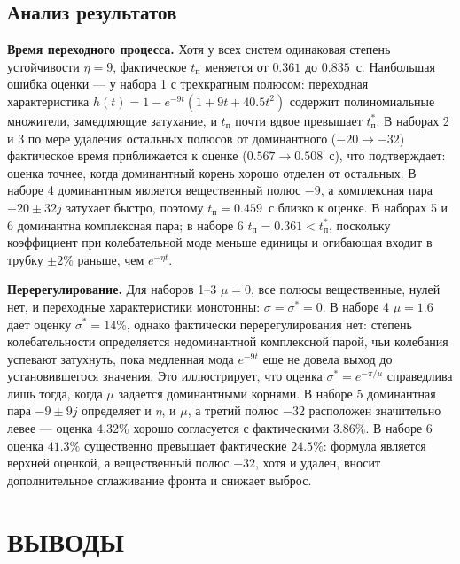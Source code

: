 \documentclass[14pt,a4paper]{extarticle}
\begin{document}
\subsection{Анализ результатов}

\textbf{Время переходного процесса.} Хотя у всех систем одинаковая степень устойчивости $\eta = 9$, фактическое $t_\text{п}$ меняется от $0.361$ до $0.835$~с. Наибольшая ошибка оценки — у набора 1 с трехкратным полюсом: переходная характеристика $h(t) = 1 - e^{-9t}\left(1 + 9t + 40.5t^2\right)$ содержит полиномиальные множители, замедляющие затухание, и $t_\text{п}$ почти вдвое превышает $t_\text{п}^*$. В наборах 2 и 3 по мере удаления остальных полюсов от доминантного ($-20 \to -32$) фактическое время приближается к оценке ($0.567 \to 0.508$~с), что подтверждает: оценка точнее, когда доминантный корень хорошо отделен от остальных. В наборе 4 доминантным является вещественный полюс $-9$, а комплексная пара $-20\pm 32j$ затухает быстро, поэтому $t_\text{п} = 0.459$~с близко к оценке. В наборах 5 и 6 доминантна комплексная пара; в наборе 6 $t_\text{п} = 0.361 < t_\text{п}^*$, поскольку коэффициент при колебательной моде меньше единицы и огибающая входит в трубку $\pm2\%$ раньше, чем $e^{-\eta t}$.

\textbf{Перерегулирование.} Для наборов 1--3 $\mu = 0$, все полюсы вещественные, нулей нет, и переходные характеристики монотонны: $\sigma = \sigma^* = 0$. В наборе 4 $\mu = 1.6$ дает оценку $\sigma^* = 14\%$, однако фактически перерегулирования нет: степень колебательности определяется недоминантной комплексной парой, чьи колебания успевают затухнуть, пока медленная мода $e^{-9t}$ еще не довела выход до установившегося значения. Это иллюстрирует, что оценка $\sigma^* = e^{-\pi/\mu}$ справедлива лишь тогда, когда $\mu$ задается доминантными корнями. В наборе 5 доминантная пара $-9 \pm 9j$ определяет и $\eta$, и $\mu$, а третий полюс $-32$ расположен значительно левее — оценка $4.32\%$ хорошо согласуется с фактическими $3.86\%$. В наборе 6 оценка $41.3\%$ существенно превышает фактические $24.5\%$: формула является верхней оценкой, а вещественный полюс $-32$, хотя и удален, вносит дополнительное сглаживание фронта и снижает выброс.

\newpage
\section*{ВЫВОДЫ}
\end{document}
